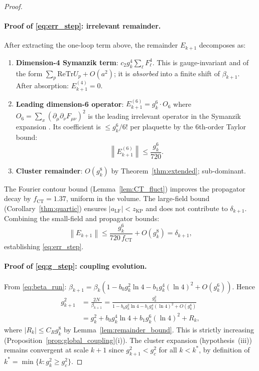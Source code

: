 \documentclass[11pt,a4paper]{amsart}
\theoremstyle{definition}
\newcommand{\re}{\mathrm{Re}}
\newcommand{\Tr}{\mathrm{Tr}}
\newcommand{\norm}[1]{\left\|#1\right\|}
\newcommand{\gB}{g^2_c}
\newcommand{\zKP}{z_{\mathrm{KP}}}
\newcommand{\CT}{\mathrm{CT}}
\begin{document}
\begin{proof}
\paragraph{Proof of \eqref{eq:err_step}: irrelevant remainder.}
After extracting the one-loop term above, the remainder $E_{k+1}$ decomposes as:
\begin{enumerate}[label=(\alph*)]
\item \textbf{Dimension-4 Symanzik term}: $c_2 g^4_k \sum_\ell F^4_\ell$.
  This is gauge-invariant and of the form $\sum_p \re\Tr U_p + O(a^2)$;
  it is \emph{absorbed} into a finite shift of $\beta_{k+1}$.
  After absorption: $E^{(4)}_{k+1} = 0$.
\item \textbf{Leading dimension-6 operator}: $E^{(6)}_{k+1} = g^6_k \cdot O_6$
  where $O_6 = \sum_x (\partial_\mu\partial_\nu F_{\mu\nu})^2$ is the
  leading irrelevant operator in the Symanzik expansion \cite[Ch.~2]{B87}.
  Its coefficient is $\le g^6_k/6!$ per plaquette by the 6th-order Taylor bound:
  \[
    \norm{E^{(6)}_{k+1}} \le \frac{g^6_k}{720}.
  \]
\item \textbf{Cluster remainder}: $O(g^8_k)$ by Theorem~\ref{thm:extended};
  sub-dominant.
\end{enumerate}
The Fourier contour bound (Lemma~\ref{lem:CT_fluct}) improves the
propagator decay by $f_{\CT} = 1.37$, uniform in the volume.
The large-field bound (Corollary~\ref{thm:quartic}) ensures
$|a_{\mathrm{LF}}| < \zKP$ and does not contribute to $\delta_{k+1}$.
Combining the small-field and propagator bounds:
\[
  \norm{E_{k+1}} \le \frac{g^6_k}{720\,f_{\CT}} + O(g^8_k)
  = \delta_{k+1},
\]
establishing \eqref{eq:err_step}.

\paragraph{Proof of \eqref{eq:g_step}: coupling evolution.}
From \eqref{eq:beta_run}: $\beta_{k+1} = \beta_k(1 - b_0 g^2_k \ln 4
- b_1 g^4_k (\ln 4)^2 + O(g^6_k))$.
Hence
\begin{align*}
  g^2_{k+1} &= \frac{2N}{\beta_{k+1}}
  = \frac{g^2_k}{1 - b_0 g^2_k \ln 4 - b_1 g^4_k(\ln 4)^2 + O(g^6_k)} \\
  &= g^2_k + b_0 g^4_k \ln 4 + b_1 g^6_k(\ln 4)^2 + R_k,
\end{align*}
where $|R_k| \le C_R g^8_k$ by Lemma~\ref{lem:remainder_bound}.
This is strictly increasing (Proposition~\ref{prop:global_coupling}(i)).  The cluster expansion (hypothesis~(iii)) remains
convergent at scale $k+1$ since $g^2_{k+1} < \gB$ for all $k < k^*$,
by definition of $k^* = \min\{k : g^2_k \ge \gB\}$.
\end{proof}
\end{document}

